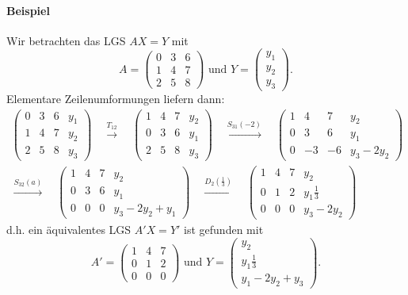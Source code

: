 \paragraph{Beispiel}
	Wir betrachten das LGS $ AX=Y $ mit 
	\[	A = \begin{pmatrix}
		0 & 3 & 6\\
		1 & 4 & 7\\
		2 & 5 & 8
		\end{pmatrix}
		\text{ und }
		Y = \begin{pmatrix}
		y_1 \\ y_2 \\ y_3
		\end{pmatrix}. \]
	Elementare Zeilenumformungen liefern dann:
	\begin{gather*}
	\begin{pmatrix}
		0 & 3 & 6 & y_1\\
		1 & 4 & 7 & y_2\\
		2 & 5 & 8 & y_3
	\end{pmatrix}\quad
	\overset{T_{12}}{\to}\quad
	\begin{pmatrix}	
		1 & 4 & 7 & y_2\\
		0 & 3 & 6 & y_1\\
		2 & 5 & 8 & y_3
	\end{pmatrix}\quad
	\overset{S_{31}(-2)}{\to}\quad
	\begin{pmatrix}	
		1 & 4 & 7 & y_2\\
		0 & 3 & 6 & y_1\\
		0 & -3 & -6 & y_3-2y_2
	\end{pmatrix}\\
	\overset{S_{32}(a)}{\to}\quad
	\begin{pmatrix}	
		1 & 4 & 7 & y_2\\
		0 & 3 & 6 & y_1\\
		0 & 0 & 0 & y_3-2y_2+y_1
	\end{pmatrix}\quad
	\overset{D_2(\frac{1}{3})}{\to}\quad
	\begin{pmatrix}	
		1 & 4 & 7 & y_2\\
		0 & 1 & 2 & y_1 \frac{1}{3}\\
		0 & 0 & 0 & y_3-2y_2
	\end{pmatrix}
	 \end{gather*}
	 d.h. ein äquivalentes LGS $ A'X=Y' $ ist gefunden mit
	 	\[ A' = 
	 	\begin{pmatrix}	
	 		1 & 4 & 7 \\
	 		0 & 1 & 2 \\
	 		0 & 0 & 0 
	 	\end{pmatrix}
	 	\text{ und }
	 	Y = \begin{pmatrix}
	 	y_2 \\ y_1\frac{1}{3} \\ y_1-2y_2+y_3
	 	\end{pmatrix}.\]

